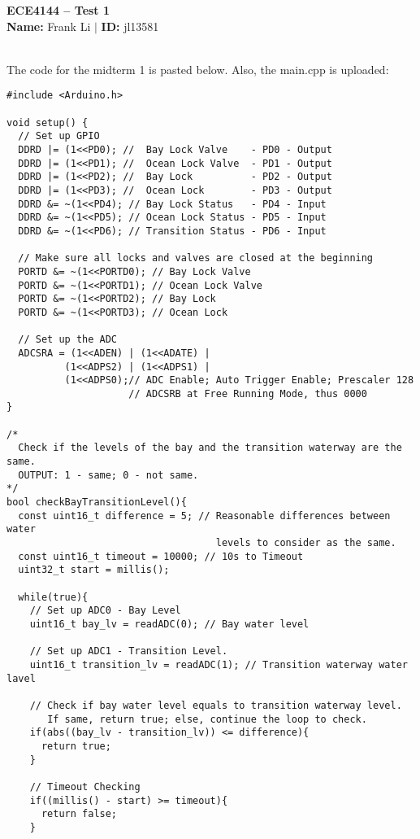 \documentclass{article}
\begin{document}
\begin{minipage}{0.9\textwidth}
    \centering
    {\LARGE\textbf{ECE4144 – Test 1}}\\[0.5em]
    \textbf{Name:} Frank Li $|$ \textbf{ID:} jl13581
\end{minipage}\\[1em]
The code for the midterm 1 is pasted below. Also, the main.cpp is uploaded:
\begin{verbatim}
#include <Arduino.h>

void setup() {
  // Set up GPIO
  DDRD |= (1<<PD0); //  Bay Lock Valve    - PD0 - Output
  DDRD |= (1<<PD1); //  Ocean Lock Valve  - PD1 - Output
  DDRD |= (1<<PD2); //  Bay Lock          - PD2 - Output
  DDRD |= (1<<PD3); //  Ocean Lock        - PD3 - Output
  DDRD &= ~(1<<PD4); // Bay Lock Status   - PD4 - Input
  DDRD &= ~(1<<PD5); // Ocean Lock Status - PD5 - Input
  DDRD &= ~(1<<PD6); // Transition Status - PD6 - Input

  // Make sure all locks and valves are closed at the beginning
  PORTD &= ~(1<<PORTD0); // Bay Lock Valve
  PORTD &= ~(1<<PORTD1); // Ocean Lock Valve
  PORTD &= ~(1<<PORTD2); // Bay Lock
  PORTD &= ~(1<<PORTD3); // Ocean Lock

  // Set up the ADC
  ADCSRA = (1<<ADEN) | (1<<ADATE) | 
          (1<<ADPS2) | (1<<ADPS1) | 
          (1<<ADPS0);// ADC Enable; Auto Trigger Enable; Prescaler 128
                     // ADCSRB at Free Running Mode, thus 0000
}

/*
  Check if the levels of the bay and the transition waterway are the same.
  OUTPUT: 1 - same; 0 - not same.
*/
bool checkBayTransitionLevel(){
  const uint16_t difference = 5; // Reasonable differences between water 
                                    levels to consider as the same. 
  const uint16_t timeout = 10000; // 10s to Timeout
  uint32_t start = millis();

  while(true){
    // Set up ADC0 - Bay Level
    uint16_t bay_lv = readADC(0); // Bay water level

    // Set up ADC1 - Transition Level.
    uint16_t transition_lv = readADC(1); // Transition waterway water lavel

    // Check if bay water level equals to transition waterway level. 
       If same, return true; else, continue the loop to check. 
    if(abs((bay_lv - transition_lv)) <= difference){
      return true;
    }

    // Timeout Checking
    if((millis() - start) >= timeout){
      return false;
    }


\end{verbatim}
\end{document}
